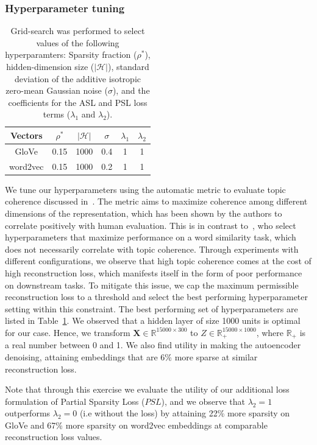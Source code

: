 \documentclass[letterpaper]{article} %
\begin{document}
\subsubsection{Hyperparameter tuning}
\begin{table}[t]
\centering
\begin{tabular}{|c|c|c|c|c|c|}\hline
Vectors & $\rho^{*}$ & $|\mathcal{H}|$ & $\sigma$ & $\lambda_1$ & $\lambda_2$ \\ \hline
GloVe & 0.15 & 1000 & 0.4 & 1 & 1 \\ \hline
word2vec & 0.15 & 1000 & 0.2 & 1 & 1 \\ \hline
\end{tabular}
\caption{Grid-search was performed to select values of the following hyperparamters: Sparsity fraction ($\rho^{*}$), hidden-dimension size ($|\mathcal{H}|$), standard deviation of the additive isotropic zero-mean Gaussian noise ($\sigma$), and the coefficients for the ASL and PSL loss terms ($\lambda_1$ and $\lambda_2$).}
\label{tbl:hyperparameters}
\end{table}
We tune our hyperparameters using the automatic metric to evaluate topic coherence discussed in~\cite{lau2014machine}. The metric aims to maximize coherence among different dimensions of the representation, which has been shown by the authors to correlate positively with human evaluation. This is in contrast to~\cite{faruqui2015sparse}, who select hyperparameters that maximize performance on a word similarity task, which does not necessarily correlate with topic coherence. Through experiments with different configurations, we observe that high topic coherence comes at the cost of high reconstruction loss, which manifests itself in the form of poor performance on downstream tasks. To mitigate this issue, we cap the maximum permissible reconstruction loss to a threshold and select the best performing hyperparameter setting within this constraint. The best performing set of hyperparameters are listed in Table~\ref{tbl:hyperparameters}. We observed that a hidden layer of size 1000 units is optimal for our case. Hence, we transform $\mathbf{X} \in \mathbb{R}^{15000 \times 300}$ to $Z \in \mathbb{R}_{+}^{15000 \times 1000}$, where $\mathbb{R}_+$ is a real number between 0 and 1. We also find utility in making the autoencoder denoising, attaining embeddings that are 6\% more sparse at similar reconstruction loss.


Note that through this exercise we evaluate the utility of our additional loss formulation of Partial Sparsity Loss ($PSL$), and we observe that $\lambda_2 = 1$ outperforms $\lambda_2 = 0$ (i.e without the loss) by attaining 22\% more sparsity on GloVe and 67\% more sparsity on word2vec embeddings at comparable reconstruction loss values.  
\end{document}
